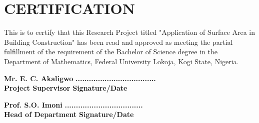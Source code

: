 \documentclass[12pt,a4paper,openany,titlepage,reqno, final]{report}
\theoremstyle{definition}
\begin{document}
	\doublespacing
	\chapter*{CERTIFICATION}
	
	This is to certify that this Research Project titled "Application of Surface Area in Building Construction" has been read and approved as meeting the partial fulfillment of the requirement of the Bachelor of Science degree in the Department of Mathematics, Federal University Lokoja, Kogi State, Nigeria.
	
	\vspace{2.5cm}
	\noindent \textbf{Mr. E. C. Akaligwo}  \hspace{5.5cm} \textbf{....................................}\\
	\textbf{Project Supervisor} \hspace{7cm} \textbf{Signature/Date }
	
	\vspace{2.5cm}
	
	\noindent \textbf{Prof. S.O. Imoni} \hspace{6.0cm}
	\textbf{...................................}\\
	\textbf{Head of Department} \hspace{6.5cm} \textbf{Signature/Date }
		\vspace{2.5cm}
	
\end{document}
